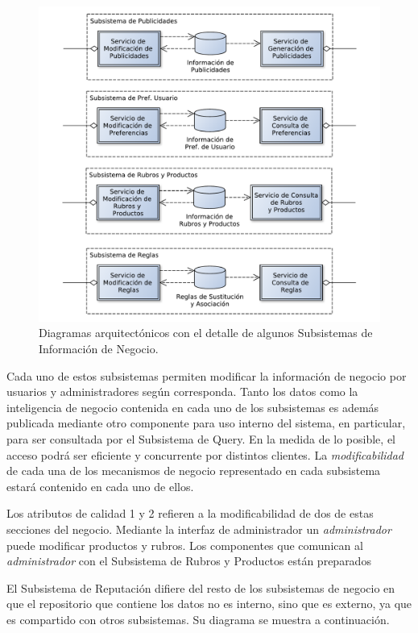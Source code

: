 \begin{figure}[H]
	\centering
	\includegraphics[width=\textwidth]{graficos/arch/subsistemas_neg.pdf}
	\caption{Diagramas arquitectónicos con el detalle de algunos \textsf{Subsistemas de Información de Negocio}.}
\end{figure}

Cada uno de estos subsistemas permiten modificar la información de negocio por usuarios y administradores según corresponda. Tanto los datos como la inteligencia de negocio contenida en cada uno de los subsistemas es además publicada mediante otro componente para uso interno del sistema, en particular, para ser consultada por el \textsf{Subsistema de Query}. En la medida de lo posible, el acceso podrá ser eficiente y concurrente por distintos clientes. La \emph{modificabilidad} de cada una de los mecanismos de negocio representado en cada subsistema estará contenido en cada uno de ellos.

Los atributos de calidad 1 y 2 refieren a la modificabilidad de dos de estas secciones del negocio. Mediante la \textsf{interfaz de administrador} un \emph{administrador} puede modificar productos y rubros. Los componentes que comunican al \emph{administrador} con el \textsf{Subsistema de Rubros y Productos} están preparados 

El \textsf{Subsistema de Reputación} difiere del resto de los subsistemas de negocio en que el repositorio que contiene los datos no es interno, sino que es externo, ya que es compartido con otros subsistemas. Su diagrama se muestra a continuación. 

